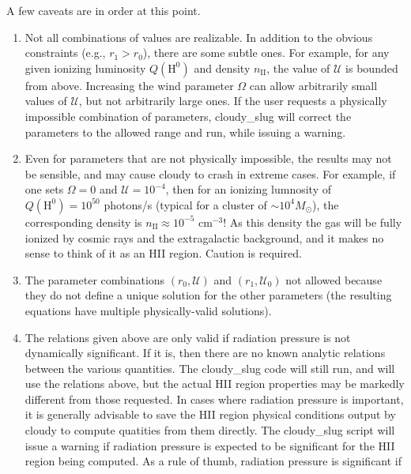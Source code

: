 \documentclass[letterpaper,10pt,english]{sphinxmanual}
\begin{document}
A few caveats are in order at this point.
\begin{enumerate}
\item {} 
Not all combinations of values are realizable. In addition to the
obvious constraints (e.g., \(r_1 > r_0\)), there are some
subtle ones. For example, for any given ionizing luminosity
\(Q(\mathrm{H}^0)\) and density \(n_{\mathrm{II}}\), the
value of \(\mathcal{U}\) is bounded from above. Increasing the
wind parameter \(\Omega\) can allow arbitrarily small values of
\(\mathcal{U}\), but not arbitrarily large ones. If the user
requests a physically impossible combination of parameters,
cloudy\_slug will correct the parameters to the allowed range and
run, while issuing a warning.

\item {} 
Even for parameters that are not physically impossible, the results
may not be sensible, and may cause cloudy to crash in extreme
cases. For example, if one sets \(\Omega = 0\) and
\(\mathcal{U} = 10^{-4}\), then for an ionizing lumnosity of
\(Q(\mathrm{H}^0) = 10^{50}\) photons/s (typical for a cluster
of \(\sim 10^4M_\odot\)), the corresponding density is
\(n_{\mathrm{II}} \approx 10^{-5}\mbox{ cm}^{-3}\)! As this
density the gas will be fully ionized by cosmic rays and the
extragalactic background, and it makes no sense to think of it as
an HII region. Caution is required.

\item {} 
The parameter combinations \((r_0,\mathcal{U})\) and
\((r_1,\mathcal{U}_0)\) not allowed
because they do not define a unique solution for the other
parameters (the resulting equations have multiple physically-valid
solutions).

\item {} 
The relations given above are only valid if radiation pressure is
not dynamically significant. If it is, then there are no known
analytic relations between the various quantities. The cloudy\_slug
code will still run, and will use the relations above, but the
actual HII region properties may be markedly different from those
requested. In cases where radiation pressure is important, it is
generally advisable to save the HII region physical conditions
output by cloudy to compute quatities from them directly. The
cloudy\_slug script will issue a warning if radiation pressure is
expected to be significant for the HII region being computed. As a rule
of thumb, radiation pressure is significant if

\end{enumerate}
\end{document}
